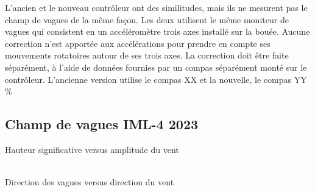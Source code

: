 \documentclass[12pt]{article}
\numberwithin{equation}{section}
\numberwithin{table}{section}
\numberwithin{figure}{section}
\begin{document}
L'ancien et le nouveau contrôleur ont des similitudes, mais ils ne mesurent
pas le champ de vagues de la même façon. Les deux utilisent le même moniteur
de vagues qui consistent en un accéléromètre trois axes installé sur la
bouée. Aucune correction n'est apportée aux accélérations pour prendre en
compte ses mouvements rotatoires autour de ses trois axes. La correction doit
être faite séparément, à l'aide de données fournies par un compas séparément
monté sur le contrôleur. L'ancienne version utilise le compas XX et la
nouvelle, le compas YY
\%
\subsection{Champ de vagues IML-4 2023}
\label{sec:orgf74c980}
Hauteur significative versus amplitude du vent
\begin{figure}[H]
\centering
{}
\end{figure} ~\\[12pt]
%
Direction des vagues versus direction du vent
\begin{figure}[H]
\centering
{}
\end{figure}
\end{document}
